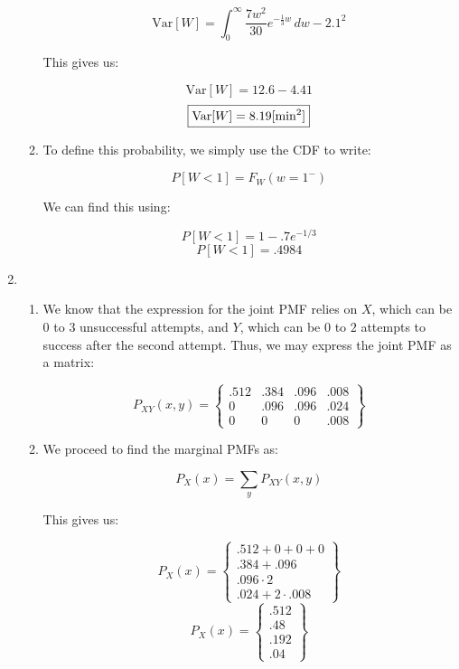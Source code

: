 \begin{enumerate}
\begin{enumerate}
        $$\text{Var}[W]=\int_0^{\infty} \frac{7w^2}{30}e^{-\frac{1}{3}w}\,dw-2.1^2$$

        This gives us:

        $$\text{Var}[W]=12.6-4.41$$
        $$\boxed{\text{Var}[W]=8.19[\si{min\squared}]}$$

      \item To define this probability, we simply use the CDF to write:

        $$P[W<1]=F_W(w=1^-)$$

        We can find this using:

        $$P[W<1]=1-.7e^{-1/3}$$
        $$\boxed{P[W<1]=.4984}$$

    \end{enumerate}

  \item

    \begin{enumerate}

      \item We know that the expression for the joint PMF relies on $X$, which can be $0$ to $3$ unsuccessful attempts, and $Y$, which can be $0$ to $2$ attempts to success after the second attempt. Thus, we may express the joint PMF as a matrix:

        $$P_{XY}(x,y)=\left\{ \begin{matrix} .512 & .384 & .096 & .008\\ 0 & .096 & .096 & .024\\ 0 & 0 & 0 & .008\end{matrix} \right\}$$

      \item We proceed to find the marginal PMFs as:

        $$P_X(x)=\sum_y P_{XY}(x,y)$$

        This gives us:

        $$P_{X}(x)=\left\{ \begin{matrix} .512 + 0 + 0 + 0 \\ .384 + .096\\ .096\cdot2\\ .024+2\cdot.008\end{matrix} \right\}$$
        $$\boxed{P_{X}(x)=\left\{ \begin{matrix} .512\\ .48\\ .192\\ .04\end{matrix} \right\}}$$


\end{enumerate}
\end{enumerate}
